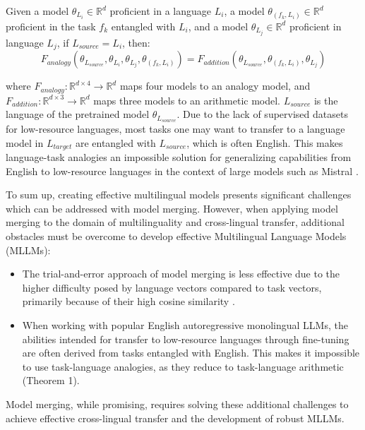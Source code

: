 \begin{theorem}\label{thm:impossibility-task-analogies}
    Given a model $\theta_{L_i} \in \mathbb{R}^{d}$ proficient in a language $L_i$, a model $\theta_{(f_k, L_i)} \in \mathbb{R}^{d}$ proficient in the task $f_k$ entangled with $L_i$, and a model $\theta_{L_j} \in \mathbb{R}^{d}$ proficient in language $L_j$, if $L_{source} = L_{i}$, then:
    $$
        F_{analogy}(\theta_{L_{source}}, \theta_{L_i}, \theta_{L_j}, \theta_{(f_k, L_i)}) = F_{addition}(\theta_{L_{source}}, \theta_{(f_k, L_i)}, \theta_{L_j})
    $$
\end{theorem}

where $F_{analogy} : \mathbb{R}^{d \times 4} \to \mathbb{R}^{d}$ maps four models to an analogy model, and $F_{addition} : \mathbb{R}^{d \times 3} \to \mathbb{R}^{d}$ maps three models to an arithmetic model. $L_{source}$ is the language of the pretrained model $\theta_{L_{source}}$. 
Due to the lack of supervised datasets for low-resource languages, most tasks one may want to transfer to a language model in $L_{target}$ are entangled with $L_{source}$, which is often English. This makes language-task analogies an impossible solution for generalizing capabilities from English to low-resource languages in the context of large models such as Mistral \cite{mistral}.

To sum up, creating effective multilingual models presents significant challenges which can be addressed with model merging. However, when applying model merging to the domain of multilinguality and cross-lingual transfer, additional obstacles must be overcome to develop effective Multilingual Language Models (MLLMs):

\begin{itemize}
    \item The trial-and-error approach of model merging \cite{mergingsurvy} is less effective due to the higher difficulty posed by language vectors compared to task vectors, primarily because of their high cosine similarity \cite{crossmerge}.
    \item When working with popular English autoregressive monolingual LLMs, the abilities intended for transfer to low-resource languages through fine-tuning are often derived from tasks entangled with English. This makes it impossible to use task-language analogies, as they reduce to task-language arithmetic (Theorem 1).
\end{itemize}

Model merging, while promising, requires solving these additional challenges to achieve effective cross-lingual transfer and the development of robust MLLMs.






